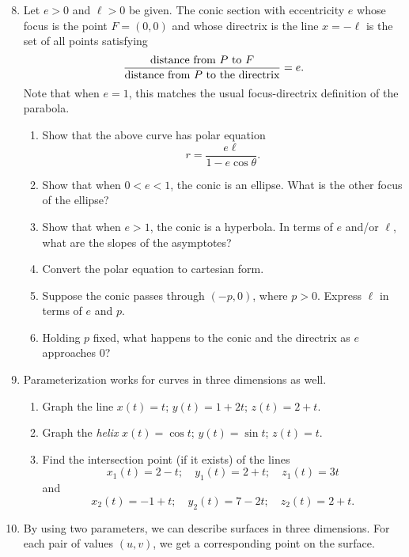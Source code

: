 \begin{enumerate}\setcounter{enumi}{7}
\item Let $e > 0$ and $\ell > 0$ be given. The conic section with eccentricity $e$ whose focus is the point $F = (0,0)$ and whose directrix is the line $x = -\ell$ is the set of all points satisfying
\begin{equation*}
\frac{\text{distance from \ensuremath{P} to \ensuremath{F}}}{\text{distance from \ensuremath{P} to the directrix}} = e.
\end{equation*}
Note that when $e = 1$, this matches the usual focus-directrix definition of the parabola.
\begin{enumerate}
\item Show that the above curve has polar equation
\begin{equation*}
r = \frac{e\ell}{1 - e\cos\theta}.
\end{equation*}
\item Show that when $0 < e < 1$, the conic is an ellipse. What is the other focus of the ellipse?
\item Show that when $e > 1$, the conic is a hyperbola. In terms of $e$ and/or $\ell$, what are the slopes of the asymptotes?
\item Convert the polar equation to cartesian form.
\item Suppose the conic passes through $(-p,0)$, where $p > 0$. Express $\ell$ in terms of $e$ and $p$.
\item Holding $p$ fixed, what happens to the conic and the directrix as $e$ approaches $0$?
\end{enumerate}\newpage
\item Parameterization works for curves in three dimensions as well.
\begin{enumerate}
\item Graph the line $x(t) = t$; $y(t) = 1 + 2t$; $z(t) = 2 + t$.
\item Graph the \emph{helix} $x(t) = \cos t$; $y(t) = \sin t$; $z(t) = t$.
\item Find the intersection point (if it exists) of the lines
\begin{equation*}
x_1(t) = 2 - t;\quad y_1(t) = 2 + t;\quad z_1(t) = 3t
\end{equation*}
and
\begin{equation*}
x_2(t) = -1 + t;\quad y_2(t) = 7 - 2t;\quad z_2(t) = 2 + t.
\end{equation*}
\end{enumerate}
\item By using two parameters, we can describe surfaces in three dimensions. For each pair of values $(u,v)$, we get a corresponding point on the surface.

\end{enumerate}
